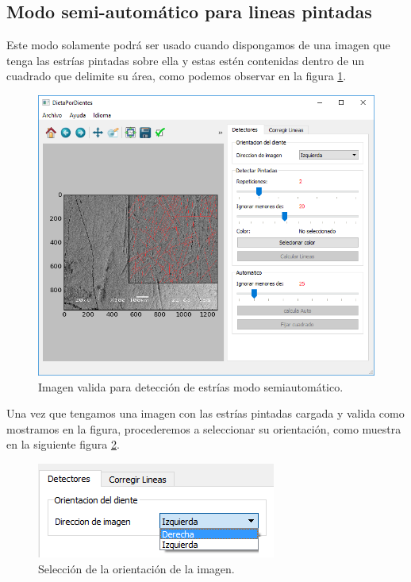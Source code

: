\documentclass[13pt]{book}              %
\begin{document}
{\subsection{Modo semi-automático para lineas pintadas}

Este modo solamente podrá ser usado cuando dispongamos de una imagen que tenga las estrías pintadas sobre ella y estas estén contenidas dentro de un cuadrado que delimite su área, como podemos observar en la figura \ref{fig:semiAutoCorrecto}.



\begin{figure}[h]
\centering
\includegraphics[width=.99\textwidth]{semiAutoCorrecto}
\caption{Imagen valida para detección de estrías modo semiautomático.}
\label{fig:semiAutoCorrecto}
\end{figure}

Una vez que tengamos una imagen con las estrías pintadas cargada y valida como mostramos en la figura, procederemos a seleccionar su orientación, como muestra en la siguiente figura \ref{fig:selOrientacion}.

\begin{figure}[h]
\centering
\includegraphics[width=.55\textwidth]{selOrientacion}
\caption{Selección de la orientación de la imagen.}
\label{fig:selOrientacion}
\end{figure}

}
\end{document}

